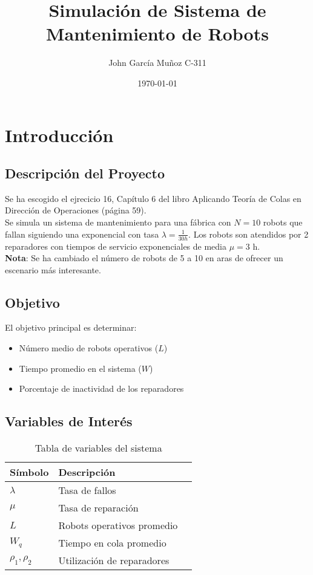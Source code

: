 \documentclass[12pt, a4paper]{article}
\title{\textbf{Simulación de Sistema de Mantenimiento de Robots}}
\author{John García Muñoz C-311}
\date{\today}
\begin{document}
\maketitle

\section{Introducción}
\label{sec:introduccion}

\subsection{Descripción del Proyecto}
Se ha escogido el ejrecicio 16, Capítulo 6 del libro Aplicando Teoría de Colas en Dirección de Operaciones (página 59).\\

Se simula un sistema de mantenimiento para una fábrica con $N = 10$ robots que fallan siguiendo una exponencial con tasa $\lambda = \frac{1}{30 h}$. Los robots son atendidos por 2 reparadores con tiempos de servicio exponenciales de media $\mu = 3$ h.\\

\textbf{Nota}: Se ha cambiado el número de robots de 5 a 10 en aras de ofrecer un escenario más interesante.

\subsection{Objetivo}
El objetivo principal es determinar:

\begin{itemize}
    \item Número medio de robots operativos ($L$)
    \item Tiempo promedio en el sistema ($W$)
    \item Porcentaje de inactividad de los reparadores
\end{itemize}

\subsection{Variables de Interés}
\begin{table}[h]
    \centering
    \begin{tabular}{lll}
        \hline
        \textbf{Símbolo} & \textbf{Descripción}\\
        \hline
        $\lambda$ & Tasa de fallos\\
        $\mu$ & Tasa de reparación\\
        $L$ & Robots operativos promedio\\
        $W_q$ & Tiempo en cola promedio\\
        $\rho_1, \rho_2$ & Utilización de reparadores\\
        \hline
    \end{tabular}
    \caption{Tabla de variables del sistema}
    \label{tab:variables}
\end{table}
\end{document}
